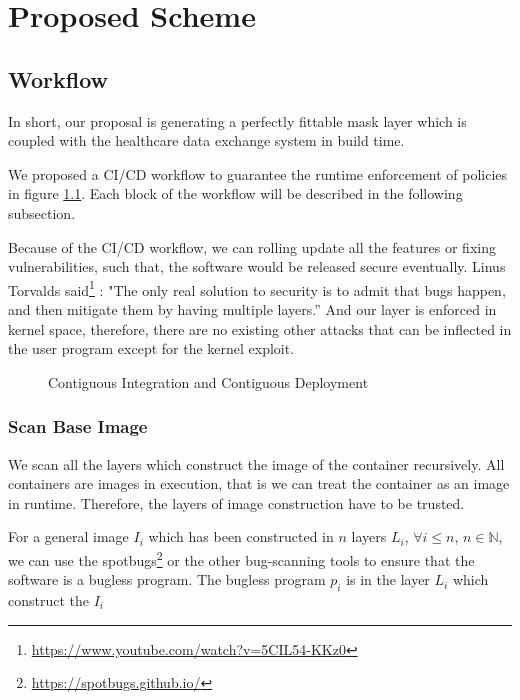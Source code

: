 \chapter{Proposed Scheme}

\section{Workflow}
In short, our proposal is generating a perfectly fittable mask layer which
is coupled with the healthcare data exchange system in build time.

We proposed a CI/CD workflow to guarantee the runtime enforcement of policies
in figure \ref{fig:workflow}. Each block of the workflow will be described
in the following subsection.

Because of the CI/CD workflow, we can rolling update all the features or
fixing vulnerabilities, such that, the software would be released secure
eventually. Linus Torvalds said\footnote{\url{https://www.youtube.com/watch?v=5CIL54-KKz0}}
: "The only real solution to security is to admit that bugs happen, and
then mitigate them by having multiple layers.” And our layer is enforced
in kernel space, therefore, there are no existing other attacks that can
be inflected in the user program except for the kernel exploit.

\begin{figure}
    \centering
    \label{fig:workflow}
    \caption{Contiguous Integration and Contiguous Deployment}
\end{figure}

\subsection{Scan Base Image}
We scan all the layers which construct the image of the container recursively.
All containers are images in execution, that is we can treat the container
as an image in runtime. Therefore, the layers of image construction have to
be trusted.

For a general image $I_i$ which has been constructed in $n$ layers $L_i$,
$\forall i \le n$, $n \in \mathbb{N}$, we can use the spotbugs\footnote{\url{https://spotbugs.github.io/}}
or the other bug-scanning tools to ensure that the software is a bugless program.
The bugless program $p_i$ is in the layer $L_i$ which construct the $I_i$


